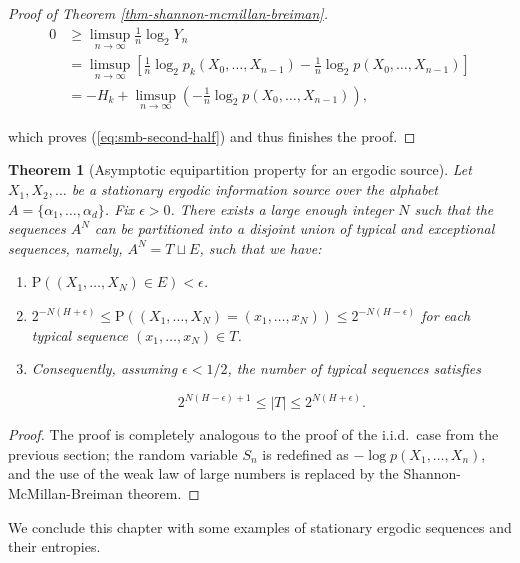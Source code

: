 \documentclass[11pt]{report}
\theoremstyle{plain}
\newtheorem{thm}{Theorem}[chapter]
\theoremstyle{definition}
\begin{document}
\begin{proof}[Proof of Theorem \ref{thm-shannon-mcmillan-breiman}]
\begin{align*}
0 &\ge \limsup_{n\to\infty} \frac{1}{n} \log_2 Y_n \\
&= \limsup_{n\to\infty} \left[
\frac{1}{n} \log_2 p_k(X_0,\ldots,X_{n-1}) - \frac{1}{n}\log_2 p(X_0,\ldots,X_{n-1}) \right] \\
&=
-H_k + \limsup_{n\to\infty} \left(- \frac{1}{n}\log_2 p(X_0,\ldots,X_{n-1}) \right),
\end{align*}

which proves (\ref{eq:smb-second-half}) and thus finishes the proof.
\end{proof}

\begin{thm}[Asymptotic equipartition property for an ergodic source]
Let $X_1,X_2,\ldots$ be a stationary ergodic information source over the alphabet $A=\{\alpha_1,\ldots,\alpha_d\}$. Fix $\epsilon>0$. There exists a large enough integer $N$ such that the sequences $A^N$ can be partitioned into a disjoint union of typical and exceptional sequences, namely, $A^N = T \sqcup E$, such that we have:

\begin{enumerate}[label=\arabic*.]
\item $\mathrm{P}((X_1,\ldots,X_N) \in E) < \epsilon$.
\item $2^{-N\left(H + \epsilon\right)} \le \mathrm{P}((X_1,\ldots,X_N)=(x_1,\ldots,x_N)) \le 2^{-N\left(H - \epsilon\right)}$ for each typical sequence $(x_1,\ldots,x_N)\in T$.
\item Consequently, assuming $\epsilon<1/2$, the number of typical sequences satisfies

\[
2^{N (H-\epsilon)+1} \le |T| \le 2^{N (H+\epsilon)}.
\]
\end{enumerate}

\end{thm}

\begin{proof}
The proof is completely analogous to the proof of the i.i.d.\ case from the previous section; the random variable $S_n$ is redefined as $-\log p(X_1,\ldots,X_n)$, and the use of the weak law of large numbers is replaced by the Shannon-McMillan-Breiman theorem.
\end{proof}

We conclude this chapter with some examples of stationary ergodic sequences and their entropies.
\end{document}
